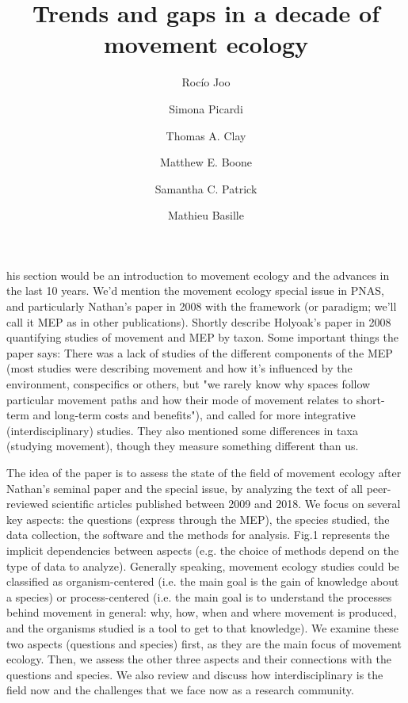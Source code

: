 \documentclass[9pt,twocolumn,twoside,lineno]{pnas-new}
\title{Trends and gaps in a decade of movement ecology}
\author[a,2]{Rocío Joo}
\author[a]{Simona Picardi}
\author[b,1]{Thomas A. Clay}
\author[a,1]{Matthew E. Boone}
\author[b]{Samantha C. Patrick}
\author[a]{Mathieu Basille}
\affil[a]{Department of Wildlife Ecology and Conservation, Fort Lauderdale Research and Education Center, University of Florida, Fort Lauderdale, FL, USA}
\affil[b]{School of Environmental Sciences, University of Liverpool, Liverpool, UK}
\begin{document}
\maketitle
\thispagestyle{firststyle}

his section would be an introduction to movement ecology and the advances in the last 10 years.  We'd mention the movement ecology special issue in PNAS, and particularly Nathan's paper in 2008 with the framework (or paradigm; we'll call it MEP as in other publications). Shortly describe Holyoak's paper in 2008 quantifying studies of movement and MEP by taxon. Some important things the paper says: There was a lack of studies of the different components of the MEP  (most studies were describing movement and how it's influenced by the environment, conspecifics or others, but "we rarely know why spaces follow particular movement paths and how their mode of movement relates to short-term and long-term costs and benefits"), and called for more integrative (interdisciplinary) studies. They also mentioned some differences in taxa (studying movement), though they measure something different than us. 

The idea of the paper is to assess the state of the field of movement ecology after Nathan's seminal paper and the special issue, by analyzing the text of all peer-reviewed scientific articles published between 2009 and 2018. We focus on several key aspects: the questions (express through the MEP), the species studied, the data collection, the software and the methods for analysis. Fig.1 represents the implicit dependencies between aspects (e.g. the choice of methods depend on the type of data to analyze). Generally speaking, movement ecology studies could be classified as organism-centered (i.e. the main goal is the gain of knowledge about a species) or process-centered (i.e. the main goal is to understand the processes behind movement in general: why, how, when and where movement is produced, and the organisms studied is a tool to get to that knowledge). We examine these two aspects (questions and species) first, as they are the main focus of movement ecology.  Then, we assess the other three aspects and their connections with the questions and species. We also review and discuss how interdisciplinary is the field now and the challenges that we face now as a research community.
\end{document}
